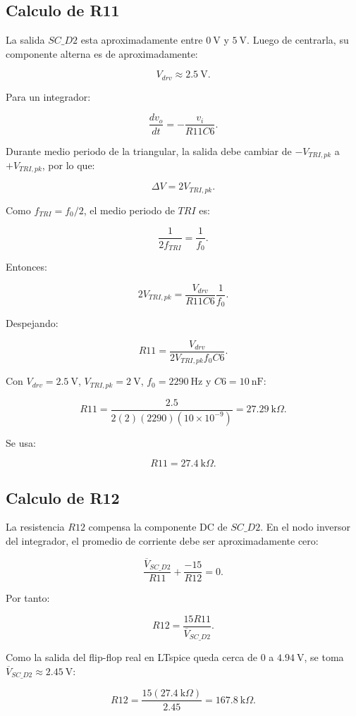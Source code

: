 ﻿\documentclass[11pt,letterpaper]{article}
\newcommand{\kohm}{\text{k}\Omega}
\begin{document}
\subsection{Calculo de R11}

La salida \(SC\_D2\) esta aproximadamente entre \(0~\text{V}\) y
\(5~\text{V}\). Luego de centrarla, su componente alterna es de
aproximadamente:

\[
V_{drv}\approx 2.5~\text{V}.
\]

Para un integrador:

\[
\frac{dv_o}{dt}=-\frac{v_i}{R11C6}.
\]

Durante medio periodo de la triangular, la salida debe cambiar de
\(-V_{TRI,pk}\) a \(+V_{TRI,pk}\), por lo que:

\[
\Delta V=2V_{TRI,pk}.
\]

Como \(f_{TRI}=f_0/2\), el medio periodo de \(TRI\) es:

\[
\frac{1}{2f_{TRI}}=\frac{1}{f_0}.
\]

Entonces:

\[
2V_{TRI,pk}=
\frac{V_{drv}}{R11C6}\frac{1}{f_0}.
\]

Despejando:

\[
R11=
\frac{V_{drv}}{2V_{TRI,pk}f_0C6}.
\]

Con \(V_{drv}=2.5~\text{V}\), \(V_{TRI,pk}=2~\text{V}\),
\(f_0=2290~\text{Hz}\) y \(C6=10~\text{nF}\):

\[
R11=
\frac{2.5}{2(2)(2290)(10\times10^{-9})}
=27.29~\kohm.
\]

Se usa:

\[
\boxed{R11=27.4~\kohm}.
\]

\subsection{Calculo de R12}

La resistencia \(R12\) compensa la componente DC de \(SC\_D2\). En el nodo
inversor del integrador, el promedio de corriente debe ser aproximadamente
cero:

\[
\frac{\overline{V}_{SC\_D2}}{R11}
+\frac{-15}{R12}=0.
\]

Por tanto:

\[
R12=\frac{15R11}{\overline{V}_{SC\_D2}}.
\]

Como la salida del flip-flop real en LTspice queda cerca de \(0\) a
\(4.94~\text{V}\), se toma
\(\overline{V}_{SC\_D2}\approx 2.45~\text{V}\):

\[
R12=\frac{15(27.4~\kohm)}{2.45}=167.8~\kohm.
\]
\end{document}
